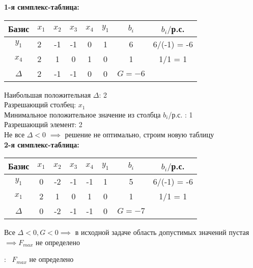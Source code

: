 \begin{flushleft}
    {\bf1-я симплекс-таблица:}
\end{flushleft}

\begin{center}
    \begin{tabular}{|c | g c c c c c c|} 
         \hline
            Базис & $x_1$ & $x_2$ & $x_3$ & $x_4$ & $y_1$ & $b_i$ & $b_i/$р.с.\\
         \hline
            $y_1$ & 2 & -1 & -1 & 0 & 1 & 6 & 6/(-1) = -6\\
         \hline
            $x_4$ & 2 & 1 & 0 & 1 & 0 & 1 & 1/1 = 1\\
         \hline
            $\Delta$ & 2 & -1 & -1 & 0 & 0 & $G = -6$ &\\
         \hline
    \end{tabular}
\end{center}

\begin{flushleft}
    Наибольшая положительная $\Delta$: 2\\
    Разрешающий столбец: $x_1$\\
    Минимальное положительное значение из столбца $b_i$/р.с. : 1\\
    Разрешающий элемент: 2\\
    Не все $\Delta < 0$ $\implies$ решение не оптимально, строим новую таблицу\\
    {\bf2-я симплекс-таблица:}\\
\end{flushleft}

\begin{center}
    \begin{tabular}{|c | c c c c c c c|} 
         \hline
            Базис & $x_1$ & $x_2$ & $x_3$ & $x_4$ & $y_1$ & $b_i$ & $b_i/$р.с.\\
         \hline
            $y_1$ & 0 & -2 & -1 & -1 & 1 & 5 & 6/(-1) = -6\\
         \hline
            $x_1$ & 2 & 1 & 0 & 1 & 0 & 1 & 1/1 = 1\\
         \hline
            $\Delta$ & 0 & -2 & -1 & -1 & 0 & $G = -7$ &\\
         \hline
    \end{tabular}
\end{center}

\begin{flushleft}
    Все $\Delta < 0, G < 0 \implies $ в исходной задаче область допустимых значений пустая $\implies F_{max} $ не определено 
\end{flushleft}

{:~} $F_{max}$ не определено
